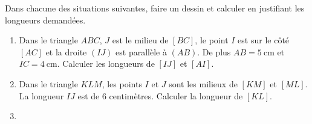 
\begin{exercice}\label{exosmath-0998}

    Dans chacune des situations suivantes, faire un dessin et calculer en justifiant les longueurs demandées.
    \begin{enumerate}
        \item\label{ItemXPXYooSzRbQC}
            Dans le triangle \( ABC\), \( J\) est le milieu de \( [BC]\), le point \( I\) est sur le côté \( [AC]\) et la droite \( (IJ)\) est parallèle à \( (AB)\). De plus \( AB=\SI{5}{\centi\meter}\) et \( IC=\SI{4}{\centi\meter}\). Calculer les longueurs de \( [IJ]\) et \( [AI]\).
        \item
            Dans le triangle \( KLM\), les points \( I\) et \( J\) sont les milieux de \( [KM]\) et \( [ML]\). La longueur \( IJ\) est de \( 6\) centimètres. Calculer la longueur de \( [KL]\).
        \item
\begin{center}
   
\end{center}
    \end{enumerate}

\end{exercice}
